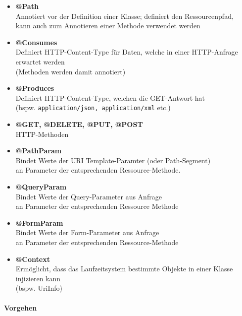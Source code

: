 \documentclass[a4paper]{article}
\begin{document}
				\begin{itemize}
					\item \textbf{@Path}\\
					Annotiert vor der Definition einer Klasse; definiert den Ressourcenpfad, \\
					kann auch zum Annotieren einer Methode verwendet werden
					
					\item \textbf{@Consumes}\\
					Definiert HTTP-Content-Type für Daten, welche in einer HTTP-Anfrage erwartet werden\\ 
					(Methoden werden damit annotiert)
					
					\item \textbf{@Produces}\\
					Definiert HTTP-Content-Type, welchen die GET-Antwort hat\\
					(bspw. \texttt{application/json, application/xml} etc.)
					
					\item \textbf{@GET, @DELETE, @PUT, @POST}\\
					HTTP-Methoden
					
					\item \textbf{@PathParam}\\
					Bindet Werte der URI Template-Paramter (oder Path-Segment) \\
					an Parameter der entsprechenden Ressource-Methode.
					
					\item \textbf{@QueryParam}\\
					Bindet Werte der Query-Parameter aus Anfrage\\
					an Parameter der entsprechenden Ressource Methode
					
					\item \textbf{@FormParam}\\
					Bindet Werte der Form-Parameter aus Anfrage\\
					an Parameter der entsprechenden Ressource-Methode
					
					\item \textbf{@Context}\\
					Ermöglicht, dass das Laufzeitsystem bestimmte Objekte in einer Klasse injizieren kann\\ (bspw. UriInfo)
				\end{itemize}
			
			\newpage
			
			\paragraph{Vorgehen}
			
\end{document}
